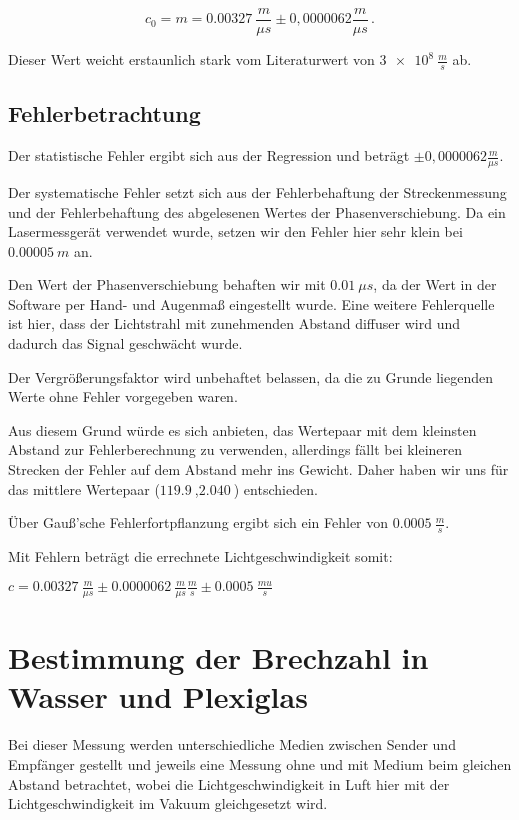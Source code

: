 \begin{equation}
    c_0  = m = \SI{0,00327}{\frac{m}{\mu s}} \pm 0,0000062{\frac{m}{\mu s}}\,.
\end{equation}

Dieser Wert weicht erstaunlich stark vom Literaturwert von $\SI{3e8}{\frac{m}{s}}$ ab.

\subsection{Fehlerbetrachtung}

Der statistische Fehler ergibt sich aus der Regression und beträgt $\pm 0,0000062{\frac{m}{\mu s}}$.

Der systematische Fehler setzt sich aus der Fehlerbehaftung der Streckenmessung und der Fehlerbehaftung des abgelesenen Wertes der Phasenverschiebung.
Da ein Lasermessgerät verwendet wurde, setzen wir den Fehler hier sehr klein bei $\SI{0,00005}{m}$ an.

Den Wert der Phasenverschiebung behaften wir mit $\SI{0,01}{\mu s}$, da der Wert in der Software per Hand- und Augenmaß eingestellt wurde.
Eine weitere Fehlerquelle ist hier, dass der Lichtstrahl mit zunehmenden Abstand diffuser wird und dadurch das Signal geschwächt wurde.

Der Vergrößerungsfaktor wird unbehaftet belassen, da die zu Grunde liegenden Werte ohne Fehler vorgegeben waren.

Aus diesem Grund würde es sich anbieten, das Wertepaar mit dem kleinsten Abstand zur Fehlerberechnung zu verwenden, allerdings fällt bei kleineren Strecken der Fehler auf dem Abstand mehr ins Gewicht.
Daher haben wir uns für das mittlere Wertepaar ($\SI{119,9}{}$,$\SI{2,040}{}$) entschieden.

Über Gauß'sche Fehlerfortpflanzung ergibt sich ein Fehler von $\SI{0,0005}{\frac{m}{s}}$.

Mit Fehlern beträgt die errechnete Lichtgeschwindigkeit somit:

$c = \SI{0,00327}{\frac{m}{\mu s}} \pm \SI{0,0000062}{\frac{m}{\mu s}}{\frac{m}{s}} \pm \SI{0,0005}{\frac{mu}{s}}$


\section{Bestimmung der Brechzahl in Wasser und Plexiglas}

Bei dieser Messung werden unterschiedliche Medien zwischen Sender und Empfänger gestellt und jeweils eine Messung ohne und mit Medium beim gleichen Abstand betrachtet, wobei die Lichtgeschwindigkeit in Luft hier mit der Lichtgeschwindigkeit im Vakuum gleichgesetzt wird.

